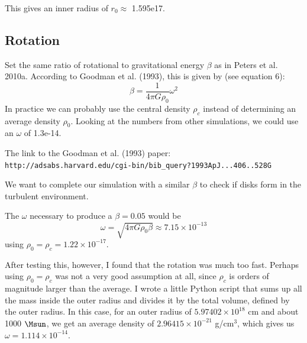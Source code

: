 \documentclass[a4paper]{tufte-handout}
\begin{document}
This gives an inner radius of $r_0 \approx$ 1.595e17. 

\subsection*{Rotation}

Set the same ratio of rotational to gravitational energy $\beta$ as in Peters et al. 2010a. According to Goodman et al. (1993), this is given by (see equation 6):
\begin{equation}
\beta = \frac{1}{4 \pi G \rho_0} \omega^2
\end{equation}
In practice we can probably use the central density $\rho_c$ instead of determining an average density $\rho_0$. Looking at the numbers from other simulations, we could use an $\omega$ of 1.3e-14.

The link to the Goodman et al. (1993) paper:\\
{\tt http://adsabs.harvard.edu/cgi-bin/bib\_query?1993ApJ...406..528G}

We want to complete our simulation with a similar $\beta$ to check if disks form in the turbulent environment.

The $\omega$ necessary to produce a $\beta = 0.05$ would be
\begin{equation}
\omega = \sqrt{4 \pi G \rho_0 \beta} \approx 7.15\times 10^{-13}
\end{equation}
using $\rho_0 = \rho_c = 1.22\times10^{-17}$.

After testing this, however, I found that the rotation was much too fast. Perhaps using $\rho_0 = \rho_c$ was not a very good assumption at all, since $\rho_c$ is orders of magnitude larger than the average. I wrote a little Python script that sums up all the mass inside the outer radius and divides it by the total volume, defined by the outer radius. In this case, for an outer radius of $5.97402\times 10^{18}$ cm and about 1000 $\Msun$, we get an average density of $2.96415\times 10^{-21}$ g/cm$^3$, which gives us $\omega = 1.114 \times 10^{-14}$.





\end{document}
